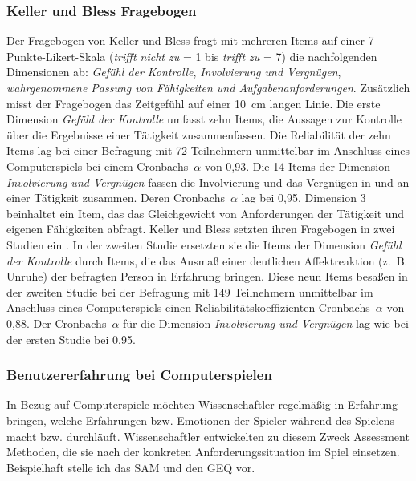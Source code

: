 \subsubsection{Keller und Bless Fragebogen} 

\label{ssub:keller_und_bless_fragebogen}

Der Fragebogen von Keller und Bless fragt mit mehreren Items auf einer 7-Punkte-Likert-Skala (\emph{trifft nicht zu} = 1 bis \emph{trifft zu} = 7) die nachfolgenden Dimensionen ab: \emph{Gefühl der Kontrolle}, \emph{Involvierung und Vergnügen}, \emph{wahrgenommene Passung von Fähigkeiten und Aufgabenanforderungen}. Zusätzlich misst der Fragebogen das Zeitgefühl auf einer 10~cm langen Linie. Die erste Dimension \emph{Gefühl der Kontrolle} umfasst zehn Items, die Aussagen zur Kontrolle über die Ergebnisse einer Tätigkeit zusammenfassen. Die Reliabilität der zehn Items lag bei einer Befragung mit 72 Teilnehmern unmittelbar im Anschluss eines Computerspiels bei einem Cronbachs~$\alpha$ von 0,93. Die 14 Items der Dimension \emph{Involvierung und Vergnügen} fassen die Involvierung und das Vergnügen in und an einer Tätigkeit zusammen. Deren Cronbachs~$\alpha$ lag bei 0,95. Dimension 3 beinhaltet ein Item, das das Gleichgewicht von Anforderungen der Tätigkeit und eigenen Fähigkeiten abfragt. Keller und Bless setzten ihren Fragebogen in zwei Studien ein \citep{Keller2008}. In der zweiten Studie ersetzten sie die Items der Dimension \emph{Gefühl der Kontrolle} durch Items, die das Ausmaß einer deutlichen Affektreaktion (z.~B. Unruhe) der befragten Person in Erfahrung bringen. Diese neun Items besaßen in der zweiten Studie bei der Befragung mit 149 Teilnehmern unmittelbar im Anschluss eines Computerspiels einen Reliabilitätskoeffizienten Cronbachs~$\alpha$ von 0,88. Der Cronbachs~$\alpha$ für die Dimension \emph{Involvierung und Vergnügen} lag wie bei der ersten Studie bei 0,95.

\subsubsection{Benutzererfahrung bei Computerspielen} 

\label{ssub:benutzererfahrung_bei_computerspielen}

In Bezug auf Computerspiele möchten Wissenschaftler regelmäßig in Erfahrung bringen, welche Erfahrungen bzw. Emotionen der Spieler während des Spielens macht bzw. durchläuft. Wissenschaftler entwickelten zu diesem Zweck Assessment Methoden, die sie nach der konkreten Anforderungssituation im Spiel einsetzen. Beispielhaft stelle ich das \ac{SAM} und den \ac{GEQ} vor. 

